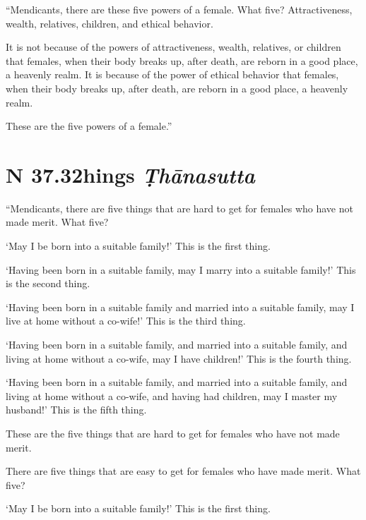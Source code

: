 \documentclass[12pt,openany]{book}%
\newcommand*{\suttatitleacronym}[1]{\smaller[2]{#1}\vspace*{.3em}}
\newcommand*{\suttatitletranslation}[1]{\linebreak{#1}}
\newcommand*{\suttatitleroot}[1]{\linebreak\smaller[2]\itshape{#1}}
\newcommand*{\tocacronym}[1]{\hspace*{-3.3em}{#1}\quad}
\newcommand*{\toctranslation}[1]{#1}
\newcommand*{\tocroot}[1]{(\textit{#1})}
\begin{document}
“Mendicants, there are these five powers of a female. What five? Attractiveness, wealth, relatives, children, and ethical behavior. 

It is not because of the powers of attractiveness, wealth, relatives, or children that females, when their body breaks up, after death, are reborn in a good place, a heavenly realm. It is because of the power of ethical behavior that females, when their body breaks up, after death, are reborn in a good place, a heavenly realm. 

These are the five powers of a female.” 

%
\section*{{\suttatitleacronym SN 37.32}{\suttatitletranslation Things }{\suttatitleroot Ṭhānasutta}}
\addcontentsline{toc}{section}{\tocacronym{SN 37.32} \toctranslation{Things } \tocroot{Ṭhānasutta}}

“Mendicants, there are five things that are hard to get for females who have not made merit. What five? 

‘May I be born into a suitable family!’ This is the first thing. 

‘Having been born in a suitable family, may I marry into a suitable family!’ This is the second thing. 

‘Having been born in a suitable family and married into a suitable family, may I live at home without a co-wife!’ This is the third thing. 

‘Having been born in a suitable family, and married into a suitable family, and living at home without a co-wife, may I have children!’ This is the fourth thing. 

‘Having been born in a suitable family, and married into a suitable family, and living at home without a co-wife, and having had children, may I master my husband!’ This is the fifth thing. 

These are the five things that are hard to get for females who have not made merit. 

There are five things that are easy to get for females who have made merit. What five? 

‘May I be born into a suitable family!’ This is the first thing. 
\end{document}
